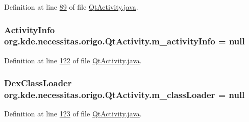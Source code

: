 Definition at line \hyperlink{_qt_activity_8java_source_l00089}{89} of file \hyperlink{_qt_activity_8java_source}{Qt\-Activity.\-java}.

\hypertarget{classorg_1_1kde_1_1necessitas_1_1origo_1_1_qt_activity_adefefee8d1e89be30fc46c957d4efc3a}{
\subsubsection[{m\-\_\-activity\-Info}]{\setlength{\rightskip}{0pt plus 5cm}Activity\-Info org.\-kde.\-necessitas.\-origo.\-Qt\-Activity.\-m\-\_\-activity\-Info = null\hspace{0.3cm}{\ttfamily [private]}}}\label{db/d37/classorg_1_1kde_1_1necessitas_1_1origo_1_1_qt_activity_adefefee8d1e89be30fc46c957d4efc3a}


Definition at line \hyperlink{_qt_activity_8java_source_l00122}{122} of file \hyperlink{_qt_activity_8java_source}{Qt\-Activity.\-java}.

\hypertarget{classorg_1_1kde_1_1necessitas_1_1origo_1_1_qt_activity_a74280d673d087888a250d3c182c075b9}{
\subsubsection[{m\-\_\-class\-Loader}]{\setlength{\rightskip}{0pt plus 5cm}Dex\-Class\-Loader org.\-kde.\-necessitas.\-origo.\-Qt\-Activity.\-m\-\_\-class\-Loader = null\hspace{0.3cm}{\ttfamily [private]}}}\label{db/d37/classorg_1_1kde_1_1necessitas_1_1origo_1_1_qt_activity_a74280d673d087888a250d3c182c075b9}


Definition at line \hyperlink{_qt_activity_8java_source_l00123}{123} of file \hyperlink{_qt_activity_8java_source}{Qt\-Activity.\-java}.

